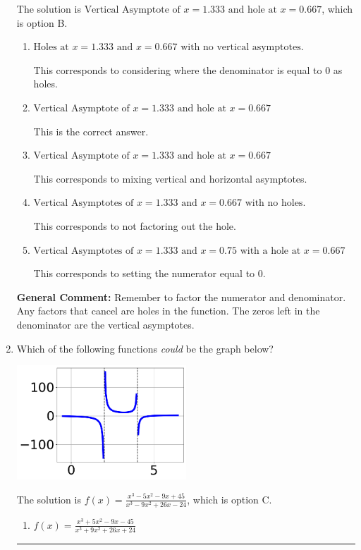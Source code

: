 \documentclass{extbook}[14pt]
\newcommand{\litem}[1]{\item #1

\rule{\textwidth}{0.4pt}}
\begin{document}
\begin{enumerate}
{The solution is \( \text{Vertical Asymptote of } x = 1.333 \text{ and hole at } x = 0.667 \), which is option B.\begin{enumerate}[label=\Alph*.]
\item \( \text{Holes at } x = 1.333 \text{ and } x = 0.667 \text{ with no vertical asymptotes.} \)

This corresponds to considering where the denominator is equal to 0 as holes.
\item \( \text{Vertical Asymptote of } x = 1.333 \text{ and hole at } x = 0.667 \)

This is the correct answer.
\item \( \text{Vertical Asymptote of } x = 1.333 \text{ and hole at } x = 0.667 \)

This corresponds to mixing vertical and horizontal asymptotes.
\item \( \text{Vertical Asymptotes of } x = 1.333 \text{ and } x = 0.667 \text{ with no holes.} \)

This corresponds to not factoring out the hole.
\item \( \text{Vertical Asymptotes of } x = 1.333 \text{ and } x = 0.75 \text{ with a hole at } x = 0.667 \)

This corresponds to setting the numerator equal to 0.
\end{enumerate}

\textbf{General Comment:} Remember to factor the numerator and denominator. Any factors that cancel are holes in the function. The zeros left in the denominator are the vertical asymptotes.
}
\litem{
Which of the following functions \textit{could} be the graph below?

\begin{center}
    \includegraphics[width=0.5\textwidth]{../Figures/identifyGraphOfRationalFunctionB.png}
\end{center}




The solution is \( f(x)=\frac{x^{3} -5 x^{2} -9 x + 45}{x^{3} -9 x^{2} +26 x -24} \), which is option C.\begin{enumerate}[label=\Alph*.]
\item \( f(x)=\frac{x^{3} +5 x^{2} -9 x -45}{x^{3} +9 x^{2} +26 x + 24} \)


\end{enumerate}}
\end{enumerate}
\end{document}
